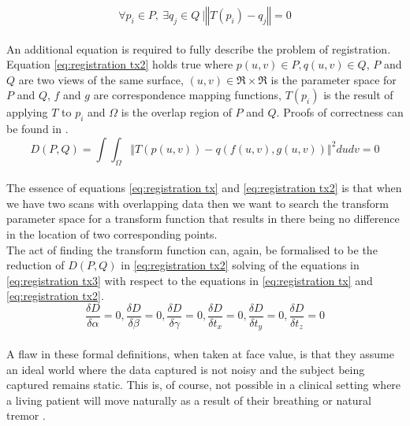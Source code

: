 \begin{equation}
    \label{eq:registration tx}
    \forall p_i \in P,\ \exists q_j \in Q\ | \left\Vert T(p_i) - q_j \right\Vert = 0
\end{equation} \\

An additional equation is required to fully describe the problem of registration. Equation \ref{eq:registration tx2} holds true where $p(u,v) \in P, q(u,v) \in Q$, $P$ and $Q$ are two views of the same surface, $(u, v) \in \mathfrak{R} \times \mathfrak{R}$ is the parameter space for $P$ and $Q$, $f$ and $g$ are correspondence mapping functions, $T(p_i)$ is the result of applying $T$ to $p_i$ and $\Omega$ is the overlap region of $P$ and $Q$. Proofs of correctness can be found in \cite{chen92}. \\ 

\begin{equation}
    \label{eq:registration tx2}
    D(P,Q) = \int \int_\Omega \left\Vert T(p(u,v)) - q(f(u,v),g(u,v))\right\Vert^2 dudv = 0
\end{equation} \\

The essence of equations \ref{eq:registration tx} and \ref{eq:registration tx2} is that when we have two scans with overlapping data then we want to search the transform parameter space for a transform function that results in there being no difference in the location of two corresponding points. \\

The act of finding the transform function can, again, be formalised to be the reduction of $D(P,Q)$ in \ref{eq:registration tx2} solving of the equations in \ref{eq:registration tx3} with respect to the equations in \ref{eq:registration tx} and \ref{eq:registration tx2}. \\

\begin{equation}
    \label{eq:registration tx3}
    \frac{\delta D}{\delta \alpha} = 0, \frac{\delta D}{\delta \beta} = 0, \frac{\delta D}{\delta \gamma} = 0, \frac{\delta D}{\delta t_x} = 0, \frac{\delta D}{\delta t_y} = 0, \frac{\delta D}{\delta t_z} = 0
\end{equation} \\

A flaw in these formal definitions, when taken at face value, is that they assume an ideal world where the data captured is not noisy and the subject being captured remains static. This is, of course, not possible in a clinical setting where a living patient will move naturally as a result of their breathing or natural tremor \cite{stiles67}. \\

